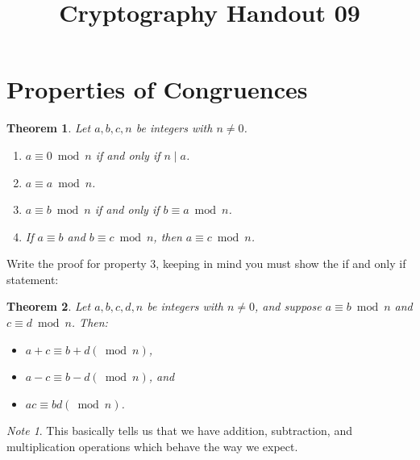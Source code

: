 \documentclass[12pt]{amsart}
\makeatletter
\def\subtitle#1{\gdef\@subtitle{#1}}
\def\@subtitle{}
\theoremstyle{plain}
\newtheorem{thm}{Theorem}[section]
\theoremstyle{definition}
\theoremstyle{remark}
\newtheorem*{note}{Note}
\makeatother
\begin{document}
\onehalfspacing

\title[]{Cryptography Handout 09}
\subtitle{Congruences}
\maketitle

\section{Properties of Congruences}
\begin{thm}
Let $a,b,c,n$ be integers with $n \neq 0$.
\begin{enumerate}[1.]
	\item $a \equiv 0 \bmod n$ if and only if $n \mid a$.
	\item $a \equiv a \bmod n$.
	\item $a \equiv b \bmod n$ if and only if $b \equiv a \bmod n$.
	\item If $a \equiv b$ and $b \equiv c \bmod n$, then $a \equiv c \bmod n$.
\end{enumerate}
\end{thm}

\noindent Write the proof for property 3, keeping in mind you must show the if and only if statement:
\vspace{2.5in}

\begin{thm}
Let $a,b,c,d,n$ be integers with $n \neq 0$, and suppose $a \equiv b \bmod n$ and $c \equiv d \bmod n$.  Then:
\begin{itemize}
	\item $a + c \equiv b + d (\bmod n)$,
	\item $a - c \equiv b - d (\bmod n)$, and
	\item $ac \equiv bd (\bmod n)$.
\end{itemize}
\end{thm}

\begin{note}
This basically tells us that we have addition, subtraction, and multiplication operations which behave the way we expect.
\end{note}
\end{document}
